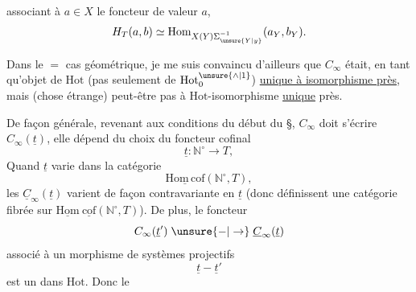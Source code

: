 associant à  $a\in X$ le foncteur \uline{}  de valeur $a$,    
\[
H_T(a,b)\simeq\mathrm{Hom}_{X(Y)\Sigma_{\unsure{Y|y}}^{-1}}(a_Y,b_Y).
\]

Dans le $=$ cas géométrique, je me suis convaincu d'ailleurs que $C_\infty$ était, en tant qu'objet de $\mathrm{Hot}$ (pas seulement de $\mathrm{Hot}_0^{\unsure{\wedge|1}}$) \uline{unique à isomorphisme près}, mais (chose étrange) peut-être pas à $\mathrm{Hot}$-isomorphisme \uline{unique} près.

De façon générale, revenant aux conditions du début du \S, $C_\infty$ doit s'écrire $C_\infty(\underline t)$, elle dépend du choix du foncteur cofinal
\[
\underline t:\mathbb N^\circ\longrightarrow T,
\]
Quand $\underline t$ varie dans la catégorie
\[
\underline{\mathrm{Hom\,cof}}(\mathbb N^\circ,T),
\]
les $\underline C_\infty(\underline t)$ varient de façon contravariante en $\underline t$ (donc définissent une catégorie fibrée sur $\underline{\mathrm{Hom}}\ \underline{\mathrm{cof}}(\mathbb N^\circ,T)$). De plus, le foncteur
\[
C_\infty(\underline t')\mathrel{\unsure{-|\to}}\underline C_\infty(\underline t)
\]
associé à un morphisme de systèmes projectifs
\[
\underline t\mathrel{-}\underline t'
\]
est un  dans \uline{$\mathrm{Hot}$}. Donc  le
